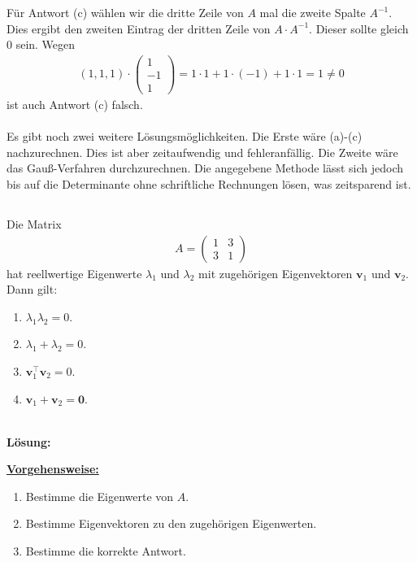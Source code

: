 Für Antwort (c) wählen wir  die dritte Zeile von $A$ mal die zweite Spalte $A^{-1}$.
Dies ergibt den zweiten Eintrag der dritten Zeile von $A \cdot A^{-1}$. Dieser sollte gleich $0$ sein.
Wegen
\begin{align*}
(1,1,1) \cdot
\begin{pmatrix}
1\\
-1 \\
1
\end{pmatrix}
= 1 \cdot 1 + 1 \cdot (-1) + 1 \cdot 1
= 1 \neq 0
\end{align*}
ist auch Antwort (c) falsch.\\
\\
Es gibt noch zwei weitere Lösungsmöglichkeiten.
Die Erste wäre (a)-(c) nachzurechnen. 
Dies ist aber zeitaufwendig und fehleranfällig.
Die Zweite wäre das Gauß-Verfahren durchzurechnen.
Die angegebene Methode lässt sich jedoch bis auf die Determinante ohne schriftliche Rechnungen lösen, was zeitsparend ist.

\newpage

\subsection*{}
Die Matrix
\begin{align*}
A 
= 
\begin{pmatrix}
1 & 3 \\
3 & 1
\end{pmatrix}
\end{align*}
hat reellwertige Eigenwerte $\lambda_1$ und $\lambda_2$
mit zugehörigen Eigenvektoren $\textbf{v}_1$ und $\textbf{v}_2$.
Dann gilt:
\renewcommand{\labelenumi}{(\alph{enumi})}
\begin{enumerate}
\item 
$\lambda_1 \lambda_2 = 0$.
\item
$\lambda_1 +  \lambda_2 = 0$.
\item
$\textbf{v}_1^\top \textbf{v}_2  = 0 $.
\item
$\textbf{v}_1 +  \textbf{v}_2  = \textbf{0} $.
\end{enumerate}
\ \\
\textbf{Lösung:}
\begin{mdframed}
\underline{\textbf{Vorgehensweise:}}
\renewcommand{\labelenumi}{\theenumi.}
\begin{enumerate}
\item Bestimme die Eigenwerte von $A$.
\item Bestimme Eigenvektoren zu den zugehörigen Eigenwerten.
\item Bestimme die korrekte Antwort.
\end{enumerate}
\end{mdframed}

